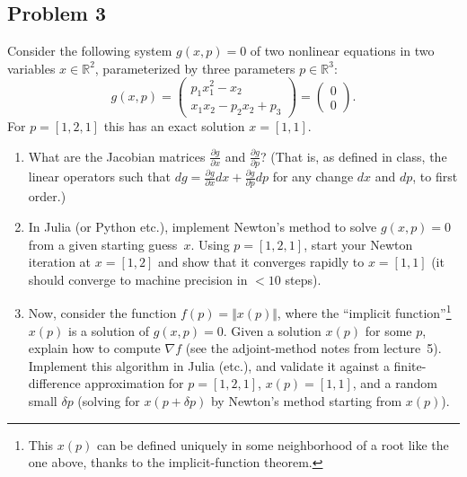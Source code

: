 \documentclass[10pt,oneside]{article}
\begin{document}
\subsection*{Problem 3}

Consider the following system $g(x,p)=0$ of two nonlinear equations
in two variables $x\in\mathbb{R}^{2}$, parameterized by three parameters
$p\in\mathbb{R}^{3}$:
\[
g(x,p)=\left(\begin{array}{c}
p_{1}x_{1}^{2}-x_{2}\\
x_{1}x_{2}-p_{2}x_{2}+p_{3}
\end{array}\right)=\left(\begin{array}{c}
0\\
0
\end{array}\right).
\]
For $p=[1,2,1]$ this has an exact solution $x=[1,1]$.
\begin{enumerate}
\item What are the Jacobian matrices $\frac{\partial g}{\partial x}$ and
$\frac{\partial g}{\partial p}$? (That is, as defined in class, the
linear operators such that $dg=\frac{\partial g}{\partial x}dx+\frac{\partial g}{\partial p}dp$
for any change $dx$ and $dp$, to first order.)
\item In Julia (or Python etc.), implement Newton's method to solve $g(x,p)=0$
from a given starting guess~$x$. Using $p=[1,2,1]$, start your
Newton iteration at $x=[1,2]$ and show that it converges rapidly
to $x=[1,1]$ (it should converge to machine precision in $<10$ steps).
\item Now, consider the function $f(p)=\Vert x(p)\Vert$, where the ``implicit
function''\footnote{This $x(p)$ can be defined uniquely in some neighborhood of a root
like the one above, thanks to the implicit-function theorem.} $x(p)$ is a solution of $g(x,p)=0$. Given a solution $x(p)$ for
some $p$, explain how to compute $\nabla f$ (see the adjoint-method
notes from lecture~5). Implement this algorithm in Julia (etc.),
and validate it against a finite-difference approximation for $p=[1,2,1]$,
$x(p)=[1,1]$, and a random small $\delta p$ (solving for $x(p+\delta p)$
by Newton's method starting from $x(p)$).
\end{enumerate}
\end{document}
